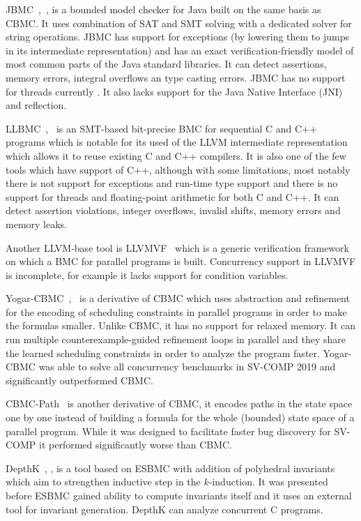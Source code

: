 JBMC~\cite{Cordeiro2019},~\cite{Cordeiro2018}, is a bounded model checker for
Java built on the same basis as CBMC.
It uses combination of SAT and SMT solving with a dedicated solver for string
operations.
JBMC has support for exceptions (by lowering them to jumps in its intermediate
representation) and has an exact verification-friendly model of most common
parts of the Java standard libraries.
It can detect assertions, memory errors, integral overflows an type casting
errors.
JBMC has no support for threads currently .
It also lacks support for the Java Native Interface (JNI) and reflection.

LLBMC~\cite{Merz2012},~\cite{Falke2013} is an SMT-based bit-precise BMC for
sequential C and C++ programs which is notable for its used of the LLVM
intermediate representation which allows it to reuse existing C and C++
compilers.
It is also one of the few tools which have support of C++, although with some
limitations, most notably there is not support for exceptions and run-time type
support and there is no support for threads and floating-point arithmetic for
both C and C++.
It can detect assertion violations, integer overflows, invalid shifts, memory
errors and memory leaks.

Another LLVM-base tool is LLVMVF~\cite{Sousa2013} which is a generic verification framework on which a BMC for parallel programs is built.
Concurrency support in LLVMVF is incomplete, for example it lacks support for condition variables.

Yogar-CBMC~\cite{Yin2018},~\cite{Yin2019} is a derivative of CBMC which uses
abstraction and refinement for the encoding of scheduling constraints in
parallel programs in order to make the formulas smaller.
Unlike CBMC, it has no support for relaxed memory.
It can run multiple counterexample-guided refinement loops in parallel and they
share the learned scheduling constraints in order to analyze the program
faster.
Yogar-CBMC was able to solve all concurrency benchmarks in SV-COMP 2019 and significantly outperformed CBMC.

CBMC-Path~\cite{Khazem2019} is another derivative of CBMC, it encodes paths in
the state space one by one instead of building a formula for the whole
(bounded) state space of a parallel program.
While it was designed to facilitate faster bug discovery for SV-COMP it performed significantly worse than CBMC.

DepthK~\cite{Rocha2017}, \cite{Rocha2017svc}, is a tool based on ESBMC with
addition of polyhedral invariants which aim to strengthen inductive step in the
$k$-induction.
It was presented before ESBMC gained ability to compute invariants itself and it uses an external tool for invariant generation.
DepthK can analyze concurrent C programs.

